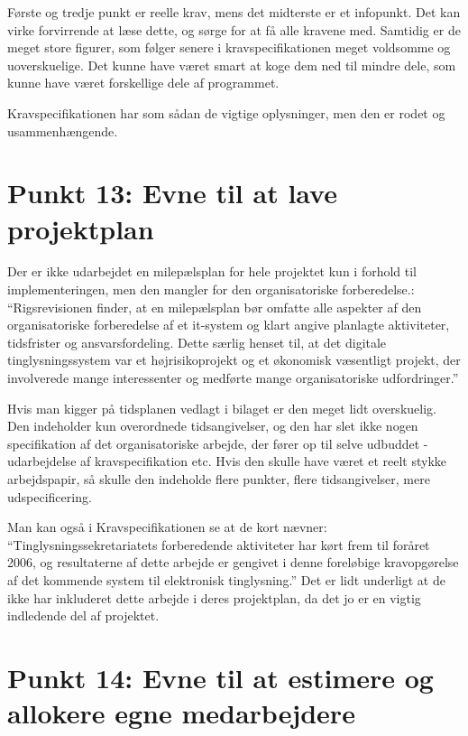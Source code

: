 \documentclass[10pt,a4paper,danish]{article}
\begin{document}
Første og tredje punkt er reelle krav, mens det midterste er et infopunkt. Det kan virke forvirrende at læse dette, og sørge for at få alle kravene med. Samtidig er de meget store figurer, som følger senere i kravspecifikationen meget voldsomme og uoverskuelige. Det kunne have været smart at koge dem ned til mindre dele, som kunne have været forskellige dele af programmet.

Kravspecifikationen har som sådan de vigtige oplysninger, men den er rodet og usammenhængende.


\section{Punkt 13: Evne til at lave projektplan}
Der er ikke udarbejdet en milepælsplan for hele projektet kun i forhold til implementeringen, men den mangler for den organisatoriske forberedelse.\cite[s.~29]{Rigs}:
``Rigsrevisionen finder, at en milepælsplan bør omfatte alle aspekter af den organisatoriske forberedelse af et it-system og klart angive planlagte aktiviteter, tidsfrister og ansvarsfordeling. Dette særlig henset til, at det digitale tinglysningssystem var et højrisikoprojekt og et økonomisk væsentligt projekt, der involverede mange interessenter og medførte mange organisatoriske udfordringer.''

Hvis man kigger på tidsplanen vedlagt i bilaget er den meget lidt overskuelig. Den indeholder kun overordnede tidsangivelser, og den har slet ikke nogen specifikation af det organisatoriske arbejde, der fører op til selve udbuddet - udarbejdelse af kravspecifikation etc. Hvis den skulle have været et reelt stykke arbejdspapir, så skulle den indeholde flere punkter, flere tidsangivelser, mere udspecificering.

Man kan også i Kravspecifikationen\cite[s.386]{Krav} se at de kort nævner: "`Tinglysningssekretariatets forberedende aktiviteter har kørt frem til foråret 2006, og resultaterne af dette arbejde er gengivet i denne foreløbige kravopgørelse af det kommende system til elektronisk tinglysning."' Det er lidt underligt at de ikke har inkluderet dette arbejde i deres projektplan, da det jo er en vigtig indledende del af projektet.



\section{Punkt 14: Evne til at estimere og allokere egne medarbejdere}
\end{document}
